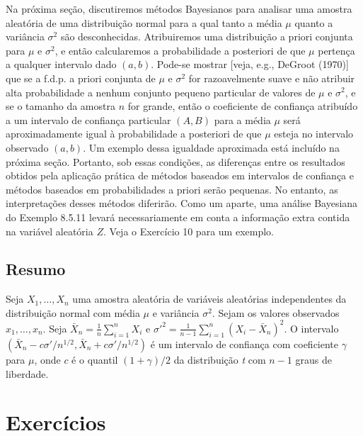 Na próxima seção, discutiremos métodos Bayesianos para analisar uma amostra aleatória de uma distribuição normal para a qual tanto a média $\mu$ quanto a variância $\sigma^2$ são desconhecidas. Atribuiremos uma distribuição a priori conjunta para $\mu$ e $\sigma^2$, e então calcularemos a probabilidade a posteriori de que $\mu$ pertença a qualquer intervalo dado $(a, b)$. Pode-se mostrar [veja, e.g., DeGroot (1970)] que se a f.d.p. a priori conjunta de $\mu$ e $\sigma^2$ for razoavelmente suave e não atribuir alta probabilidade a nenhum conjunto pequeno particular de valores de $\mu$ e $\sigma^2$, e se o tamanho da amostra $n$ for grande, então o coeficiente de confiança atribuído a um intervalo de confiança particular $(A, B)$ para a média $\mu$ será aproximadamente igual à probabilidade a posteriori de que $\mu$ esteja no intervalo observado $(a, b)$. Um exemplo dessa igualdade aproximada está incluído na próxima seção. Portanto, sob essas condições, as diferenças entre os resultados obtidos pela aplicação prática de métodos baseados em intervalos de confiança e métodos baseados em probabilidades a priori serão pequenas. No entanto, as interpretações desses métodos diferirão. Como um aparte, uma análise Bayesiana do Exemplo 8.5.11 levará necessariamente em conta a informação extra contida na variável aleatória $Z$. Veja o Exercício 10 para um exemplo.

\subsection*{Resumo}

Seja $X_1, \dots, X_n$ uma amostra aleatória de variáveis aleatórias independentes da distribuição normal com média $\mu$ e variância $\sigma^2$. Sejam os valores observados $x_1, \dots, x_n$. Seja $\bar{X}_n = \frac{1}{n}\sum_{i=1}^n X_i$ e $\sigma'^2 = \frac{1}{n-1}\sum_{i=1}^n(X_i - \bar{X}_n)^2$. O intervalo $\left(\bar{X}_n - c\sigma'/n^{1/2}, \bar{X}_n + c\sigma'/n^{1/2}\right)$ é um intervalo de confiança com coeficiente $\gamma$ para $\mu$, onde $c$ é o quantil $(1+\gamma)/2$ da distribuição \textit{t} com $n-1$ graus de liberdade.

\section*{Exercícios}

